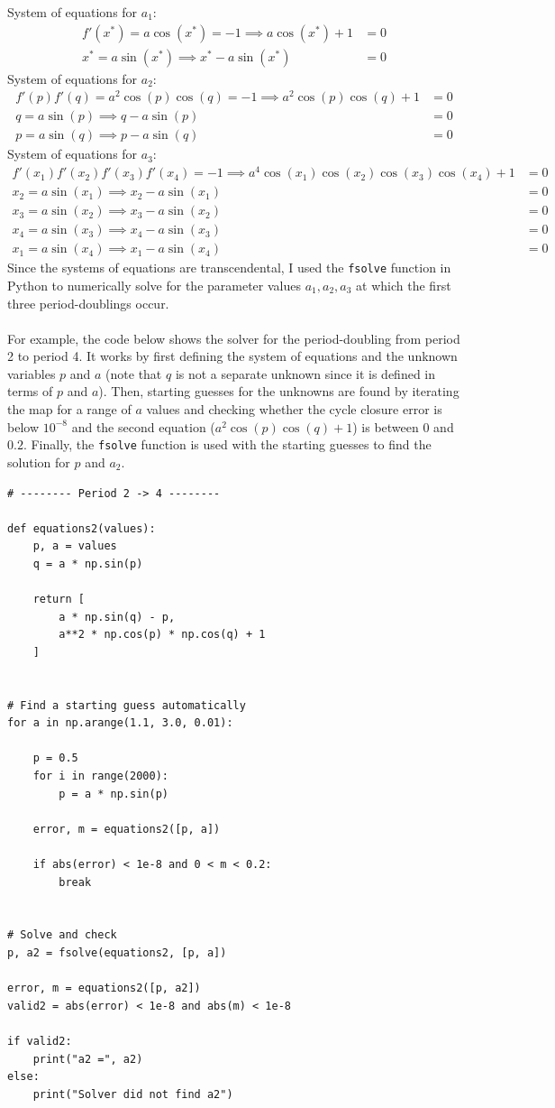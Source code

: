 \documentclass[11pt]{article}
\begin{document}
System of equations for $a_1$:
\begin{eqnarray*}
    f'(x^*) = a\cos(x^*)=-1 \implies a\cos(x^*) + 1&=0\\
    x^* = a\sin(x^*) \implies x^* - a\sin(x^*) &= 0
\end{eqnarray*}
System of equations for $a_2$:
\begin{eqnarray*}
    f'(p)f'(q) = a^2\cos(p)\cos(q)=-1 \implies a^2\cos(p)\cos(q) + 1 &=0\\
    q = a\sin(p)\implies q - a\sin(p) &= 0\\
    p = a\sin(q)\implies p - a\sin(q) &= 0
\end{eqnarray*}
System of equations for $a_3$:
\begin{eqnarray*}
    f'(x_1)f'(x_2)f'(x_3)f'(x_4) =-1 \implies a^4\cos(x_1)\cos(x_2)\cos(x_3)\cos(x_4) + 1 &=0\\
    x_2 = a\sin(x_1)\implies x_2 - a\sin(x_1) &= 0\\
    x_3 = a\sin(x_2)\implies x_3 - a\sin(x_2) &= 0\\
    x_4 = a\sin(x_3)\implies x_4 - a\sin(x_3) &= 0\\
    x_1 = a\sin(x_4)\implies x_1 - a\sin(x_4) &= 0
\end{eqnarray*}
Since the systems of equations are transcendental, I used the \texttt{fsolve} function in Python to numerically solve for the parameter values $a_1, a_2, a_3$ at which the first three period-doublings occur.\\\\
For example, the code below shows the solver for the period-doubling from period 2 to period 4. It works by first defining the system of equations and the unknown variables $p$ and $a$ (note that $q$ is not a separate unknown since it is defined in terms of $p$ and $a$). Then, starting guesses for the unknowns are found by iterating the map for a range of $a$ values and checking whether the cycle closure error is below $10^{-8}$ and the second equation ($a^2\cos(p)\cos(q)+1$) is between $0$ and $0.2$. Finally, the \texttt{fsolve} function is used with the starting guesses to find the solution for $p$ and $a_2$.
\begin{lstlisting}
# -------- Period 2 -> 4 --------

def equations2(values):
    p, a = values
    q = a * np.sin(p)

    return [
        a * np.sin(q) - p,
        a**2 * np.cos(p) * np.cos(q) + 1
    ]


# Find a starting guess automatically
for a in np.arange(1.1, 3.0, 0.01):

    p = 0.5
    for i in range(2000):
        p = a * np.sin(p)

    error, m = equations2([p, a])

    if abs(error) < 1e-8 and 0 < m < 0.2:
        break


# Solve and check
p, a2 = fsolve(equations2, [p, a])

error, m = equations2([p, a2])
valid2 = abs(error) < 1e-8 and abs(m) < 1e-8

if valid2:
    print("a2 =", a2)
else:
    print("Solver did not find a2")
\end{lstlisting}
\end{document}
